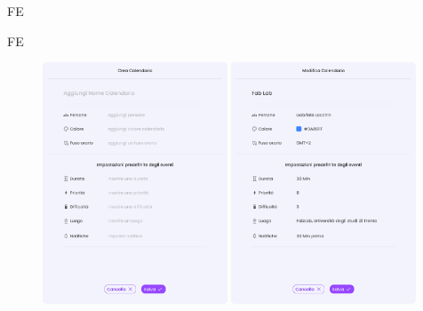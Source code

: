 \begin{listaPersonale}{FE}
\begin{listaPersonale2}{FE}
        \begin{center} 
            \begin{figure}[H]
            \centering\includegraphics[width=0.49\textwidth,height=0.35\textheight]{img/FrontEnd/Eventi/Calendario/CreaCalendario1.png}
            \centering\includegraphics[width=0.49\textwidth,height=0.35\textheight]{img/FrontEnd/Eventi/Calendario/ModificaCalendario.png}
            \end{figure}
        \end{center}
        
    \end{listaPersonale2}
    

\end{listaPersonale}
